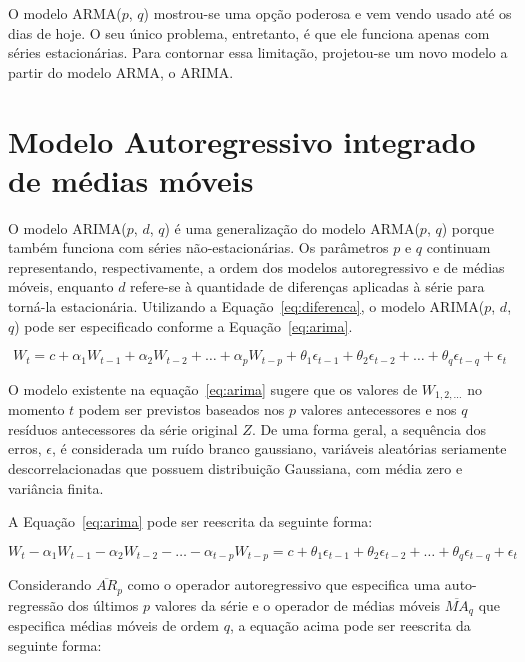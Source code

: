 

O modelo ARMA($p$, $q$) mostrou-se uma opção poderosa e vem vendo usado até os
dias de hoje. O seu único problema, entretanto, é que ele funciona apenas com
séries estacionárias. Para contornar essa limitação, projetou-se um novo modelo
a partir do modelo ARMA, o ARIMA.

\section{Modelo Autoregressivo integrado de médias móveis}

O modelo ARIMA($p$, $d$, $q$) é uma generalização do modelo ARMA($p$, $q$)
porque também funciona com séries não-estacionárias. Os parâmetros $p$ e $q$
continuam representando, respectivamente, a ordem dos modelos autoregressivo e
de médias móveis, enquanto $d$ refere-se à quantidade de diferenças aplicadas à
série para torná-la estacionária. Utilizando a Equação~\ref{eq:diferenca}, o
modelo ARIMA($p$, $d$, $q$) pode ser especificado conforme a
Equação~\ref{eq:arima}.

\begin{equation}
W_t = c + \alpha_1W_{t-1} + \alpha_2W_{t-2} + \hdots + \alpha_pW_{t-p} +
\theta_1\epsilon_{t-1} + \theta_2\epsilon_{t-2} + \hdots +
\theta_q\epsilon_{t-q} + \epsilon_t
\label{eq:arima}
\end{equation}

O modelo existente na equação~\ref{eq:arima} sugere que os valores de
$W_{1,2,\hdots}$ no momento $t$ podem ser previstos baseados nos $p$ valores
antecessores e nos $q$ resíduos antecessores da série original $Z$. De uma forma
geral, a sequência dos erros, $\epsilon$, é considerada um ruído branco
gaussiano, variáveis aleatórias seriamente descorrelacionadas que possuem
distribuição Gaussiana, com média zero e variância finita.

A Equação~\ref{eq:arima} pode ser reescrita da seguinte forma:

\[
W_t - \alpha_1W_{t-1} - \alpha_2W_{t-2} - \hdots - \alpha_{t-p}W_{t-p} = c +
\theta_1\epsilon_{t-1} +\theta_2\epsilon_{t-2} + \hdots + \theta_q\epsilon_{t-q}
+ \epsilon_t
\]

Considerando $\overline{AR}_p$ como o operador autoregressivo que especifica
uma auto-regressão dos últimos $p$ valores da série e o operador de médias
móveis $\overline{MA}_q$ que especifica médias móveis de ordem $q$, a
equação acima pode ser reescrita da seguinte forma:

